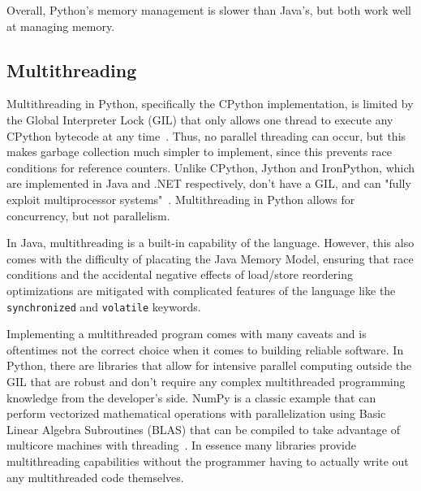 Overall, Python's memory management is slower than Java's, but both work well at managing memory.

\subsection{Multithreading}
Multithreading in Python, specifically the CPython implementation, is limited by the Global Interpreter Lock (GIL) that only allows one thread to execute any CPython bytecode at any time~\cite{pythonGIL}. Thus, no parallel threading can occur, but this makes garbage collection much simpler to implement, since this prevents race conditions for reference counters. Unlike CPython, Jython and IronPython, which are implemented in Java and .NET respectively, don't have a GIL, and can "fully exploit multiprocessor systems"~\cite{pythonGIL}. Multithreading in Python allows for concurrency, but not parallelism.

In Java, multithreading is a built-in capability of the language. However, this also comes with the difficulty of placating the Java Memory Model, ensuring that race conditions and the accidental negative effects of load/store reordering optimizations are mitigated with complicated features of the language like the \texttt{synchronized} and \texttt{volatile} keywords.

Implementing a multithreaded program comes with many caveats and is oftentimes not the correct choice when it comes to building reliable software. In Python, there are libraries that allow for intensive parallel computing outside the GIL that are robust and don't require any complex multithreaded programming knowledge from the developer's side. NumPy is a classic example that can perform vectorized mathematical operations with parallelization using Basic Linear Algebra Subroutines (BLAS) that can be compiled to take advantage of multicore machines with threading~\cite{numpyParallel}. In essence many libraries provide multithreading capabilities without the programmer having to actually write out any multithreaded code themselves.

